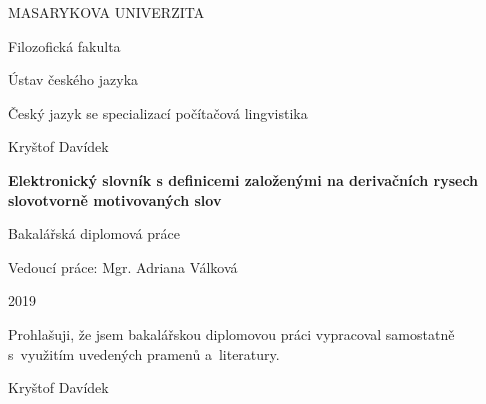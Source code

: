 \documentclass[a4paper,12pt,openany,twoside]{book} %
\begin{document}
	\clearpage

	\begin{titlepage}
		\begin{center}
			{\Large\uppercase{Masarykova univerzita}}

			\vspace{1em}

			{\Large Filozofická fakulta}

			\vspace{1em}

			{\large Ústav českého jazyka}

			\vspace{1em}

			{\large Český jazyk se specializací počítačová lingvistika}

			\vspace{11em}

			{\large Kryštof Davídek }
			
			\vspace{3em}
			
			{\LARGE\bf Elektronický slovník s definicemi založenými na derivačních rysech slovotvorně motivovaných slov}

			\vspace{1.5em}

			{\Large Bakalářská diplomová práce}

			\vfill
			\vspace{3em}
			Vedoucí práce: Mgr. Adriana Válková
			
			2019
		\end{center}
	\end{titlepage}


\cleardoublepage

\par
\par\vspace*{\fill}
	\pagestyle{plain}
\begin{flushright}
	Prohlašuji, že jsem bakalářskou diplomovou práci vypracoval samostatně s~využitím uvedených pramenů a~literatury.

	\vspace{3em}

	    \makebox[2.5in][r]{\dotfill}
	    
	    Kryštof Davídek

	    \par

\end{flushright}
\clearpage
\end{document}

